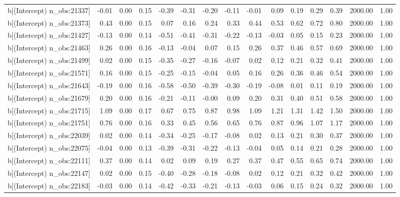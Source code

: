 \begin{table}[ht]
\begin{tabular}{rrrrrrrrrrrrrrr}
  b[(Intercept) n\_obs:21337] & -0.01 & 0.00 & 0.15 & -0.39 & -0.31 & -0.20 & -0.11 & -0.01 & 0.09 & 0.19 & 0.29 & 0.39 & 2000.00 & 1.00 \\ 
  b[(Intercept) n\_obs:21373] & 0.43 & 0.00 & 0.15 & 0.07 & 0.16 & 0.24 & 0.33 & 0.44 & 0.53 & 0.62 & 0.72 & 0.80 & 2000.00 & 1.00 \\ 
  b[(Intercept) n\_obs:21427] & -0.13 & 0.00 & 0.14 & -0.51 & -0.41 & -0.31 & -0.22 & -0.13 & -0.03 & 0.05 & 0.15 & 0.23 & 2000.00 & 1.00 \\ 
  b[(Intercept) n\_obs:21463] & 0.26 & 0.00 & 0.16 & -0.13 & -0.04 & 0.07 & 0.15 & 0.26 & 0.37 & 0.46 & 0.57 & 0.69 & 2000.00 & 1.00 \\ 
  b[(Intercept) n\_obs:21499] & 0.02 & 0.00 & 0.15 & -0.35 & -0.27 & -0.16 & -0.07 & 0.02 & 0.12 & 0.21 & 0.32 & 0.41 & 2000.00 & 1.00 \\ 
  b[(Intercept) n\_obs:21571] & 0.16 & 0.00 & 0.15 & -0.25 & -0.15 & -0.04 & 0.05 & 0.16 & 0.26 & 0.36 & 0.46 & 0.54 & 2000.00 & 1.00 \\ 
  b[(Intercept) n\_obs:21643] & -0.19 & 0.00 & 0.16 & -0.58 & -0.50 & -0.39 & -0.30 & -0.19 & -0.08 & 0.01 & 0.11 & 0.19 & 2000.00 & 1.00 \\ 
  b[(Intercept) n\_obs:21679] & 0.20 & 0.00 & 0.16 & -0.21 & -0.11 & -0.00 & 0.09 & 0.20 & 0.31 & 0.40 & 0.51 & 0.58 & 2000.00 & 1.00 \\ 
  b[(Intercept) n\_obs:21715] & 1.09 & 0.00 & 0.17 & 0.67 & 0.75 & 0.87 & 0.98 & 1.09 & 1.21 & 1.31 & 1.42 & 1.50 & 2000.00 & 1.00 \\ 
  b[(Intercept) n\_obs:21751] & 0.76 & 0.00 & 0.16 & 0.33 & 0.45 & 0.56 & 0.65 & 0.76 & 0.87 & 0.96 & 1.07 & 1.17 & 2000.00 & 1.00 \\ 
  b[(Intercept) n\_obs:22039] & 0.02 & 0.00 & 0.14 & -0.34 & -0.25 & -0.17 & -0.08 & 0.02 & 0.13 & 0.21 & 0.30 & 0.37 & 2000.00 & 1.00 \\ 
  b[(Intercept) n\_obs:22075] & -0.04 & 0.00 & 0.13 & -0.39 & -0.31 & -0.22 & -0.13 & -0.04 & 0.05 & 0.14 & 0.21 & 0.28 & 2000.00 & 1.00 \\ 
  b[(Intercept) n\_obs:22111] & 0.37 & 0.00 & 0.14 & 0.02 & 0.09 & 0.19 & 0.27 & 0.37 & 0.47 & 0.55 & 0.65 & 0.74 & 2000.00 & 1.00 \\ 
  b[(Intercept) n\_obs:22147] & 0.02 & 0.00 & 0.15 & -0.40 & -0.28 & -0.18 & -0.08 & 0.02 & 0.12 & 0.21 & 0.32 & 0.42 & 2000.00 & 1.00 \\ 
  b[(Intercept) n\_obs:22183] & -0.03 & 0.00 & 0.14 & -0.42 & -0.33 & -0.21 & -0.13 & -0.03 & 0.06 & 0.15 & 0.24 & 0.32 & 2000.00 & 1.00 \\ 

\end{tabular}
\end{table}
